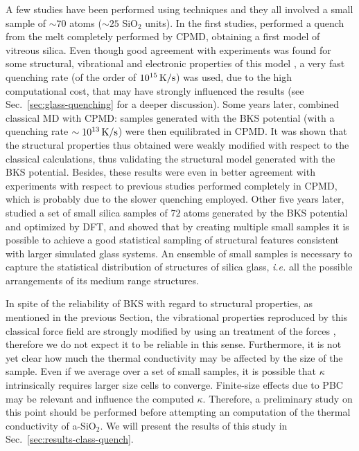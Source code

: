 A few studies have been performed using \abinitio techniques and they all involved a small sample of $\sim70$ atoms ($\sim 25$ SiO$_2$ units). In the first \abinitio studies, \citet{Sarnthein1995a} performed a quench from the melt completely performed by CPMD, obtaining a first model of vitreous silica. Even though good agreement with experiments was found for some structural, vibrational and electronic properties of this model \cite{Sarnthein1995a,Sarnthein1995b,Sarnthein1997}, a very fast quenching rate (of the order of $10^{15}\,\mathrm{K/s}$) was used, due to the high computational cost, that may have strongly influenced the results (see Sec.~\ref{sec:glass-quenching} for a deeper discussion). 
Some years later, \citet{Benoit2000} combined classical MD with CPMD: samples generated with the BKS potential (with a quenching rate $\sim 10^{13}\,\mathrm{K/s}$) were then equilibrated in CPMD. It was shown that the structural properties thus obtained were weakly modified with respect to the classical calculations, thus validating the structural model generated with the BKS potential. Besides, these results were even in better agreement with experiments with respect to previous studies performed completely in CPMD, which is probably due to the slower quenching employed. 
Other five years later, \citet{VanGinhoven2005} studied a set of small silica samples of $72$ atoms generated by the BKS potential and optimized by DFT, and showed that by creating multiple small samples it is possible to achieve a good statistical sampling of structural features consistent with larger simulated glass systems. An ensemble of small samples is necessary to capture the statistical distribution of structures of silica glass, \emph{i.e.} all the possible arrangements of its medium range structures. 

In spite of the reliability of BKS with regard to structural properties, as mentioned in the previous Section, the vibrational properties reproduced by this classical force field are strongly modified by using an \abinitio treatment of the forces \cite{Benoit2002}, therefore we do not expect it to be reliable in this sense. 
Furthermore, it is not yet clear how much the thermal conductivity may be affected by the size of the sample. Even if we average over a set of small samples, it is possible that $\kappa$ intrinsically requires larger size cells to converge. Finite-size effects due to PBC may be relevant and influence the computed $\kappa$. 
Therefore, a preliminary study on this point should be performed before attempting an \abinitio computation of the thermal conductivity of a-SiO$_2$. We will present the results of this study in Sec.~\ref{sec:results-class-quench}.


